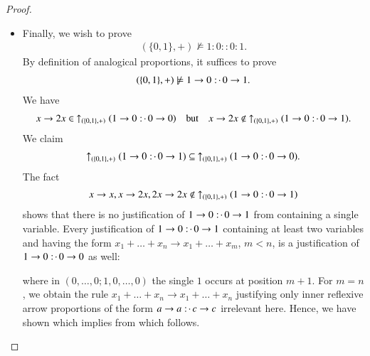 \documentclass[11pt]{amsart}
\theoremstyle{definition} %
\newcommand{\righttherefore}{:\joinrel\cdot\,}
\begin{document}
\begin{proof}
\begin{itemize}
\item Finally, we wish to prove
\begin{align}\label{equ:y_+_not_models_1001} 
	(\{0,1\},+)\not\models 1:0::0:1.
\end{align} By definition of analogical proportions, it suffices to prove 
\begin{align}\label{equ:y_+_not_models_1->0>0->1} 
	(\{0,1\},+)\not\models 1\to 0 \righttherefore 0\to 1.
\end{align} We have
\begin{align*} 
	x\to 2x\in\ \uparrow_{(\{0,1\},+)}(1\to 0 \righttherefore 0\to 0) \quad\text{but}\quad x\to 2x\not\in\ \uparrow_{(\{0,1\},+)}(1\to 0 \righttherefore 0\to 1).
\end{align*} We claim
\begin{align}\label{equ:uparrow_y_+_1->0>0->1_subseteq_uparrow_y_+_1->0>0->0} 
	\uparrow_{(\{0,1\},+)}(1\to 0 \righttherefore 0\to 1)\subseteq\ \uparrow_{(\{0,1\},+)}(1\to 0 \righttherefore 0\to 0).
\end{align} The fact
\begin{align*} 
	x\to x,x\to 2x,2x\to 2x\not\in\ \uparrow_{(\{0,1\},+)}(1\to 0 \righttherefore 0\to 1)
\end{align*} shows that there is no justification of $1\to 0 \righttherefore 0\to 1$ from  containing a single variable. Every justification of $1\to 0 \righttherefore 0\to 1$ containing at least two variables and having the form $x_1+\ldots+x_n\to x_1+\ldots+x_m$, $m<n$, is a justification of $1\to 0 \righttherefore 0\to 0$ as well:
\begin{center}
\end{center} where in $(0,\ldots,0;1,0,\ldots,0)$ the single $1$ occurs at position $m+1$. For $m=n$, we obtain the rule $x_1+\ldots+x_n\to x_1+\ldots+x_n$ justifying only inner reflexive arrow proportions of the form $a\to a \righttherefore c\to c$ irrelevant here. Hence, we have shown  which implies  from which  follows.
\end{itemize}


\end{proof}
\end{document}
